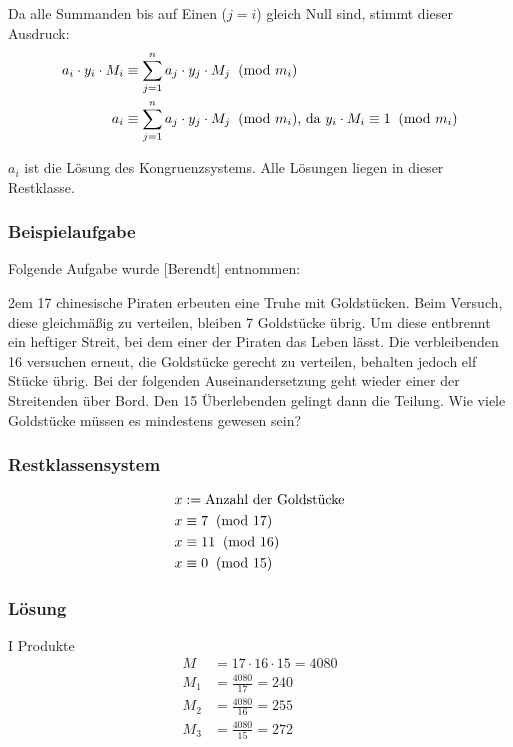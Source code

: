 Da alle Summanden bis auf Einen ($j = i$) gleich Null sind, stimmt dieser Ausdruck:
\begin{align*}
a_i \cdot y_i \cdot M_i &\equiv \sum_{j=1}^n {a_j \cdot y_j \cdot M_j} \imod{m_i}\\
a_i &\equiv \sum_{j=1}^n {a_j \cdot y_j \cdot M_j} \imod{m_i}\text{, da }y_i \cdot M_i \equiv 1 \imod{m_i}
\end{align*}

$a_i$ ist die Lösung des Kongruenzsystems. Alle Lösungen liegen in dieser Restklasse.


\subsubsection*{Beispielaufgabe}
Folgende Aufgabe wurde [Berendt] entnommen:

\hangindent2em
17 chinesische Piraten erbeuten eine Truhe mit Goldstücken. Beim Versuch, diese gleichmäßig zu verteilen, bleiben 7 Goldstücke übrig. Um diese entbrennt ein heftiger Streit, bei dem einer der Piraten das Leben lässt. Die verbleibenden 16 versuchen erneut, die Goldstücke gerecht zu verteilen, behalten jedoch elf Stücke übrig. Bei der folgenden Auseinandersetzung geht wieder einer der Streitenden über Bord. Den 15 Überlebenden gelingt dann die Teilung. Wie viele Goldstücke müssen es mindestens gewesen sein?

\subsubsection*{Restklassensystem} %
\begin{align*}
x &:= \text{Anzahl der Goldstücke}\\
x &\equiv 7 \imod{17}\\
x &\equiv 11 \imod{16}\\
x &\equiv 0 \imod{15}
\end{align*}

\subsubsection*{Lösung}
I Produkte
\begin{align*}
M   &= 17 \cdot 16 \cdot 15 = 4080\\
M_1 &= \frac{4080}{17} = 240\\
M_2 &= \frac{4080}{16} = 255\\
M_3 &= \frac{4080}{15} = 272
\end{align*}

